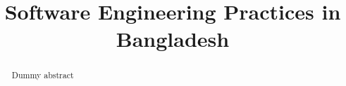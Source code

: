 \documentclass[acmsmall,table,xcdraw]{acmart}
\title{
Software Engineering Practices in Bangladesh
}
\begin{document}
\begin{abstract}
Dummy abstract
\end{abstract}
\maketitle


% 
% 
% 


% 
% 
% 





\pagebreak
\appendix

    
\end{document}
